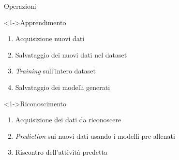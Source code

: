 \begin{tframe}{Operazioni}

    \begin{block}<1->{Apprendimento}

        \begin{enumerate}
            \item Acquisizione nuovi dati
            \item Salvataggio dei nuovi dati nel dataset
            \item \textit{Training} sull'intero dataset
            \item Salvataggio dei modelli generati
        \end{enumerate}

    \end{block}

    \begin{block}<1->{Riconoscimento}

        \begin{enumerate}
            \item Acquisizione dei dati da riconoscere
            \item \textit{Prediction} sui nuovi dati usando i modelli pre-allenati
            \item Riscontro dell'attività predetta  
        \end{enumerate}

    \end{block}    

\end{tframe}